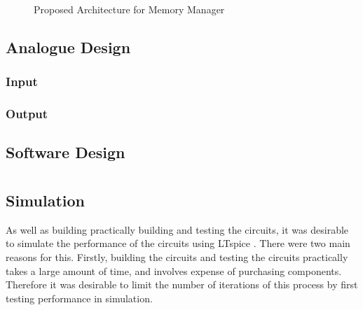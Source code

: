 \begin{figure}[ht]
	\caption{Proposed Architecture for Memory Manager}
	\label{fig:mem-manager-arch}
\end{figure}

\section{Analogue Design}

\subsection{Input}

\subsection{Output}

\section{Software Design}

\chapter{}

\section{ Simulation}
As well as building practically building and testing the circuits, it was desirable to simulate the performance of the circuits using LTspice \cite{linear2017}. There were two main reasons for this. Firstly, building the circuits and testing the circuits practically takes a large amount of time, and involves expense of purchasing components. Therefore it was desirable to limit the number of iterations of this process by first testing performance in simulation.

